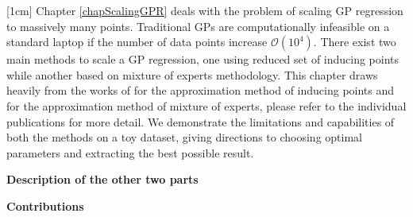 [1cm]
Chapter \ref{chapScalingGPR} deals with the problem of scaling GP regression to massively many points. Traditional GPs are computationally infeasible on a standard laptop if the number of data points increase $\mathcal{O}(10^4)$. There exist two main methods to scale a GP regression, one using reduced set of inducing points while another based on mixture of experts methodology. This chapter draws heavily from the works of \cite{quinonero2005unifying, seeger2003fast, Snelson06sparsegaussian, Titsias09variationallearning} for the approximation method of inducing points and \cite{cao2014generalized, tresp2000bayesian, chen2009bagging, deisenroth2015distributed} for the approximation method of mixture of experts, please refer to the individual publications for more detail. We demonstrate the limitations and capabilities of both the methods on a toy dataset, giving directions to choosing optimal parameters and extracting the best possible result.  

\textbf{Description of the other two parts}

\textbf{Contributions}

